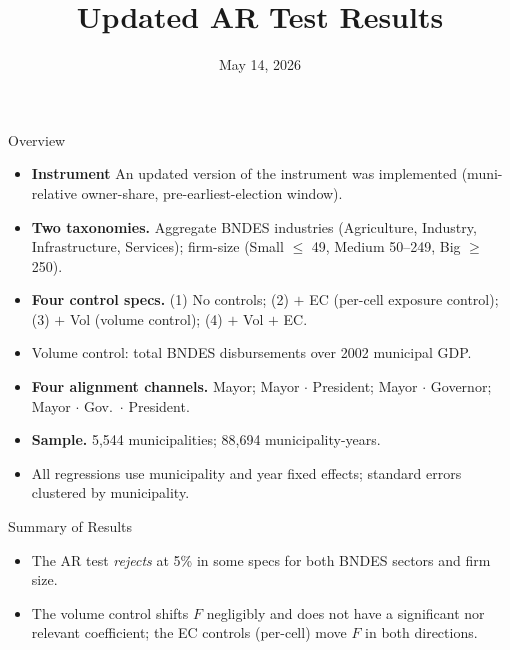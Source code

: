 \documentclass[aspectratio=169,11pt]{beamer}
\title{\textbf{Updated AR Test Results}}
\date{May 14, 2026}
\begin{document}
\begin{frame}
\titlepage
\end{frame}

\begin{frame}{Overview}
\begin{itemize}\setlength{\itemsep}{0.45em}
\item \textbf{Instrument} An updated version of the instrument was implemented (muni-relative owner-share, pre-earliest-election window).
\item \textbf{Two taxonomies.} Aggregate BNDES industries (Agriculture, Industry, Infrastructure, Services); firm-size (Small $\leq$ 49, Medium 50--249, Big $\geq$ 250).
\item \textbf{Four control specs.} (1) No controls; (2) $+$ EC (per-cell exposure control); (3) $+$ Vol (volume control); (4) $+$ Vol $+$ EC.
\item Volume control: total BNDES disbursements over 2002 municipal GDP.
\item \textbf{Four alignment channels.} Mayor; Mayor $\cdot$ President; Mayor $\cdot$ Governor; Mayor $\cdot$ Gov.\ $\cdot$ President.
\item \textbf{Sample.} 5,544 municipalities; 88,694 municipality-years.
\item All regressions use municipality and year fixed effects; standard errors clustered by municipality.
\end{itemize}
\end{frame}

\begin{frame}{Summary of Results}
\begin{itemize}\setlength{\itemsep}{0.45em}
\item The AR test \textit{rejects} at 5\% in some specs for both BNDES sectors and firm size.
\item The volume control shifts $F$ negligibly and does not have a significant nor relevant coefficient; the EC controls (per-cell) move $F$ in both directions.
\end{itemize}
\end{frame}



\end{document}
